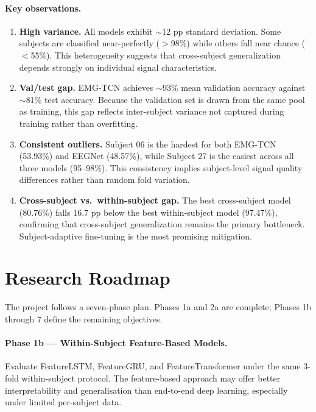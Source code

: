 \documentclass[11pt,twocolumn]{article}
\begin{document}
\paragraph{Key observations.}
\begin{enumerate}[noitemsep]
  \item \textbf{High variance.} All models exhibit $\sim$12 pp standard deviation.
        Some subjects are classified near-perfectly ($>$98\%) while others fall
        near chance ($<$55\%). This heterogeneity suggests that cross-subject
        generalization depends strongly on individual signal characteristics.
  \item \textbf{Val/test gap.} EMG-TCN achieves $\sim$93\% mean validation
        accuracy against $\sim$81\% test accuracy. Because the validation set is
        drawn from the same pool as training, this gap reflects inter-subject
        variance not captured during training rather than overfitting.
  \item \textbf{Consistent outliers.} Subject 06 is the hardest for both EMG-TCN
        (53.93\%) and EEGNet (48.57\%), while Subject 27 is the easiest across
        all three models (95--98\%). This consistency implies subject-level
        signal quality differences rather than random fold variation.
  \item \textbf{Cross-subject vs.\ within-subject gap.} The best cross-subject
        model (80.76\%) falls 16.7 pp below the best within-subject model
        (97.47\%), confirming that cross-subject generalization remains the
        primary bottleneck. Subject-adaptive fine-tuning is the most promising
        mitigation.
\end{enumerate}

\section{Research Roadmap}

The project follows a seven-phase plan. Phases 1a and 2a are complete;
Phases 1b through 7 define the remaining objectives.

\paragraph{Phase 1b — Within-Subject Feature-Based Models.}
Evaluate FeatureLSTM, FeatureGRU, and FeatureTransformer under the same
3-fold within-subject protocol. The feature-based approach may offer better
interpretability and generalisation than end-to-end deep learning, especially
under limited per-subject data.
\end{document}
